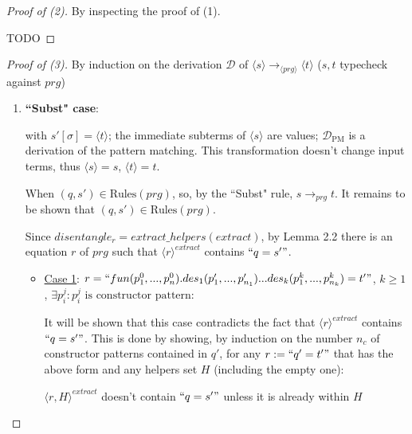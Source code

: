 \documentclass[11pt]{article} %
\begin{document}
\begin{proof}[Proof of (2)] By inspecting the proof of (1).

TODO

\end{proof}

\begin{proof}[Proof of (3)] By induction on the derivation $\mathcal{D}$ of $\langle s \rangle \longrightarrow_{\langle prg \rangle} \langle t \rangle$ ($s,t$ typecheck against $prg$)

\begin{enumerate}
\item \textbf{``Subst" case}:

\begin{prooftree}
\end{prooftree}

with $s'[\sigma] = \langle t \rangle$; the immediate subterms of $\langle s \rangle$ are values; $\mathcal{D}_{\textrm{PM}}$ is a derivation of the pattern matching. This transformation doesn't change input terms, thus $\langle s \rangle = s$, $\langle t \rangle = t$.

When $(q, s') \in \textrm{Rules}(prg)$, so, by the ``Subst" rule, $s \longrightarrow_{prg} t$. It remains to be shown that $(q, s') \in \textrm{Rules}(prg)$.

Since $disentangle_r = extract\_helpers(extract)$, by Lemma 2.2 there is an equation $r$ of $prg$ such that $\langle r \rangle^{extract}$ contains $`` q = s' "$.

\begin{itemize}

\item \underline{Case 1}: $r = `` fun(p^0_1, ..., p^0_n).des_1(p'_1, ..., p'_{n_1})...des_k(p^k_1, ..., p^k_{n_k}) = t' " $, $k \geq 1$, $\exists p^j_i: p^j_i \textrm{ is constructor pattern}$:

It will be shown that this case contradicts the fact that $\langle r \rangle^{extract}$ contains $`` q = s' "$. This is done by showing, by induction on the number $n_c$ of constructor patterns contained in $q'$, for any $r := `` q' = t' "$ that has the above form and any helpers set $H$ (including the empty one):

$\langle r , H \rangle^{extract}$ doesn't contain $`` q = s' "$ unless it is already within $H$


\end{itemize}
\end{enumerate}
\end{proof}
\end{document}
